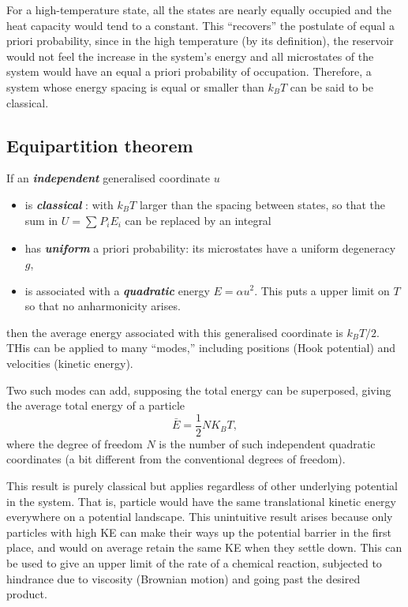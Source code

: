 \documentclass{article}
\theoremstyle{nonumberplain}
\begin{document}
For a high-temperature state, all the states are nearly equally occupied and the heat capacity would tend to a constant. This ``recovers'' the postulate of equal a priori probability, since in the high temperature (by its definition), the reservoir would not feel the increase in the system's energy and all microstates of the system would have an equal a priori probability of occupation. Therefore, a system whose energy spacing is equal or smaller than $k_B T$ can be said to be classical. 

\subsection{Equipartition theorem}
If an \textit{\textbf{independent}} generalised coordinate $u$
\begin{itemize}
    \item is \textit{\textbf{classical}} : with $k_B T$ larger than the spacing between states, so that the sum in $U = \sum_{}^{} P_i E_i$ can be replaced by an integral
    \item has \textit{\textbf{uniform}}  a priori probability: its microstates have a uniform degeneracy $g$,
    \item is associated with a \textit{\textbf{quadratic}}  energy $E = \alpha u^{2}$. This puts a upper limit on $T$ so that no anharmonicity arises. 
\end{itemize}
then the average energy associated with this generalised coordinate is $k_B T /2.$ THis can be applied to many ``modes,'' including positions (Hook potential) and velocities (kinetic energy). 

Two such modes can add, supposing the total energy can be superposed, giving the average total energy of a particle
\[
    \boxed{\bar{E} = \frac{1}{2} N K_B T,}
\]
where the degree of freedom $N$ is the number of such independent quadratic coordinates (a bit different from the conventional degrees of freedom). 

This result is purely classical but applies regardless of other underlying potential in the system. That is, particle would have the same translational kinetic energy everywhere on a potential landscape. This unintuitive result arises because only particles with high KE can make their ways up the potential barrier in the first place, and would on average retain the same KE when they settle down. This can be used to give an upper limit of the rate of a chemical reaction, subjected to hindrance due to viscosity (Brownian motion) and going past the desired product. 
\end{document}
